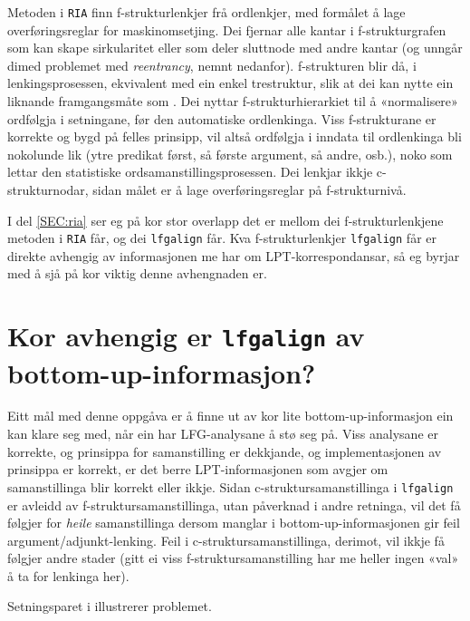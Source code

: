 \documentclass[12pt,a4paper,oneside,draft]{report}
\begin{document}
 Metoden i \texttt{RIA} \citep{graham2009osr,graham2009fts} finn
 f\hyp{}strukturlenkjer frå ordlenkjer, med formålet å lage
 overføringsreglar for maskinomsetjing. Dei fjernar alle kantar i
 f\hyp{}strukturgrafen som kan skape sirkularitet eller som deler sluttnode
 med andre kantar (og unngår dimed problemet med \emph{reentrancy}, nemnt
 nedanfor). f\hyp{}strukturen blir då, i lenkingsprosessen, ekvivalent med
 ein enkel trestruktur, slik at dei kan nytte ein liknande
 framgangsmåte som \citet{samuelsson2007apa}.  Dei nyttar
 f\hyp{}strukturhierarkiet til å «normalisere» ordfølgja i setningane, før
 den automatiske ordlenkinga. Viss f\hyp{}strukturane er korrekte og bygd
 på felles prinsipp, vil altså ordfølgja i inndata til ordlenkinga
 bli nokolunde lik (ytre predikat først, så første argument, så andre,
 osb.), noko som lettar den statistiske ordsamanstillingsprosessen.
 Dei lenkjar ikkje c\hyp{}strukturnodar, sidan målet er å lage
 overføringsreglar på f\hyp{}strukturnivå.

 I del \ref{SEC:ria} ser eg på kor stor overlapp det er mellom dei
 f\hyp{}strukturlenkjene metoden i \texttt{RIA} får, og dei \texttt{lfgalign} får. Kva
 f\hyp{}strukturlenkjer \texttt{lfgalign} får er direkte avhengig av informasjonen
 me har om LPT\hyp{}korrespondansar, så eg byrjar med å sjå på kor viktig
 denne avhengnaden er.

 
\section{Kor avhengig er \texttt{lfgalign} av bottom-up-informasjon?}
\label{sec-5.3}

 Eitt mål med denne oppgåva er å finne ut av kor lite
 bottom-up-informasjon ein kan klare seg med, når ein har
 LFG-analysane å stø seg på. Viss analysane er korrekte, og prinsippa
 for samanstilling er dekkjande, og implementasjonen av prinsippa er
 korrekt, er det berre LPT\hyp{}informasjonen som avgjer om samanstillinga
 blir korrekt eller ikkje. Sidan c\hyp{}struktursamanstillinga i \texttt{lfgalign}
 er avleidd av f\hyp{}struktursamanstillinga, utan påverknad i andre
 retninga, vil det få følgjer for \emph{heile} samanstillinga dersom
 manglar i bottom-up-informasjonen gir feil
 argument/adjunkt-lenking. Feil i c\hyp{}struktursamanstillinga, derimot,
 vil ikkje få følgjer andre stader (gitt ei viss
 f\hyp{}struktursamanstilling har me heller ingen «val» å ta for lenkinga
 her).

 Setningsparet i \Next illustrerer problemet.
\end{document}
